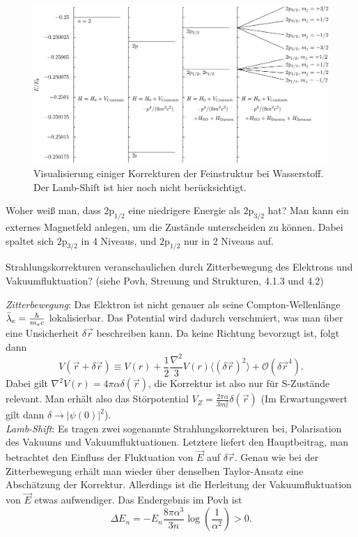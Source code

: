 \begin{figure}[!ht]
    \centering
    \includegraphics[width=\linewidth]{img/2560px-Hydrogen_fine_structure_energy_2.png}
    \caption{Visualisierung einiger Korrekturen der Feinstruktur bei Wasserstoff.
    Der Lamb-Shift ist hier noch nicht berücksichtigt.
    }
    \label{fig:feinstruktur wasserstoff}
\end{figure}

\begin{fquestion}{Woher weiß man, dass $2\mathrm{p}_{1/2}$ eine niedrigere Energie als $2\mathrm{p}_{3/2}$ hat?}
    Man kann ein externes Magnetfeld anlegen, um die Zustände unterscheiden zu können.
    Dabei spaltet sich $2\mathrm{p}_{3/2}$ in 4 Niveaus, und $2\mathrm{p}_{1/2}$ nur in 2 Niveaus auf.
\end{fquestion}

\begin{fquestion}{Strahlungskorrekturen veranschaulichen durch Zitterbewegung des Elektrons und Vakuumfluktuation?}
    (siehe Povh, Streuung und Strukturen, 4.1.3 und 4.2)
    
    \emph{Zitterbewegung}: Das Elektron ist nicht genauer als seine Compton-Wellenlänge $\Bar{\lambda}_e = \frac{\hbar}{m_ec}$ lokalisierbar.
    Das Potential wird dadurch verschmiert, was man über eine Unsicherheit $\delta\Vec{r}$ beschreiben kann.
    Da keine Richtung bevorzugt ist, folgt dann
    $$ V(\Vec{r} + \delta\Vec{r}) \equiv V(r) + \frac{1}{2} \frac{\nabla^2}{3}V(r) \langle (\delta\Vec{r})^2 \rangle  + \mathcal{O}(\delta\Vec{r}^4). $$
    Dabei gilt $\nabla^2 V(r) = 4\pi\alpha \delta (\Vec{r})$, die Korrektur ist also nur für S-Zustände relevant.
    Man erhält also das Störpotential $V_Z = \frac{2\pi \alpha}{3m_e^2} \delta (\Vec{r})$ (Im Erwartungswert gilt dann $\delta \rightarrow |\psi(0)|^2$).
    \\
    \emph{Lamb-Shift}: Es tragen zwei sogenannte Strahlungskorrekturen bei, Polarisation des Vakuums und Vakuumfluktuationen.
    Letztere liefert den Hauptbeitrag, man betrachtet den Einfluss der Fluktuation von $\Vec{E}$ auf $\delta \Vec{r}$.
    Genau wie bei der Zitterbewegung erhält man wieder über denselben Taylor-Ansatz eine Abschätzung der Korrektur.
    Allerdings ist die Herleitung der Vakuumfluktuation von $\Vec{E}$ etwas aufwendiger.
    Das Endergebnis im Povh ist 
    $$\Delta E_n = -E_n \frac{8\pi\alpha^3}{3n} \log \left( \frac{1}{\alpha^2} \right) > 0.$$
\end{fquestion}


